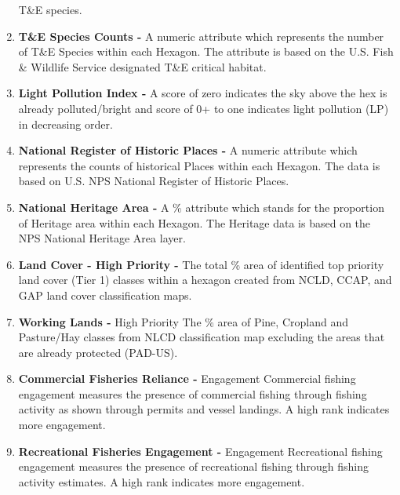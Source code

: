 \documentclass[]{article}
\begin{document}
\begin{enumerate}
  T\&E species.
\item
  \textbf{T\&E Species Counts -} A numeric attribute which represents
  the number of T\&E Species within each Hexagon. The attribute is based
  on the U.S. Fish \& Wildlife Service designated T\&E critical habitat.
\item
  \textbf{Light Pollution Index -} A score of zero indicates the sky
  above the hex is already polluted/bright and score of 0+ to one
  indicates light pollution (LP) in decreasing order.
\item
  \textbf{National Register of Historic Places -} A numeric attribute
  which represents the counts of historical Places within each Hexagon.
  The data is based on U.S. NPS National Register of Historic Places.
\item
  \textbf{National Heritage Area -} A \% attribute which stands for the
  proportion of Heritage area within each Hexagon. The Heritage data is
  based on the NPS National Heritage Area layer.
\item
  \textbf{Land Cover - High Priority -} The total \% area of identified
  top priority land cover (Tier 1) classes within a hexagon created from
  NCLD, CCAP, and GAP land cover classification maps.
\item
  \textbf{Working Lands -} High Priority The \% area of Pine, Cropland
  and Pasture/Hay classes from NLCD classification map excluding the
  areas that are already protected (PAD-US).
\item
  \textbf{Commercial Fisheries Reliance -} Engagement Commercial fishing
  engagement measures the presence of commercial fishing through fishing
  activity as shown through permits and vessel landings. A high rank
  indicates more engagement.
\item
  \textbf{Recreational Fisheries Engagement -} Engagement Recreational
  fishing engagement measures the presence of recreational fishing
  through fishing activity estimates. A high rank indicates more
  engagement.
\end{enumerate}
\end{document}

